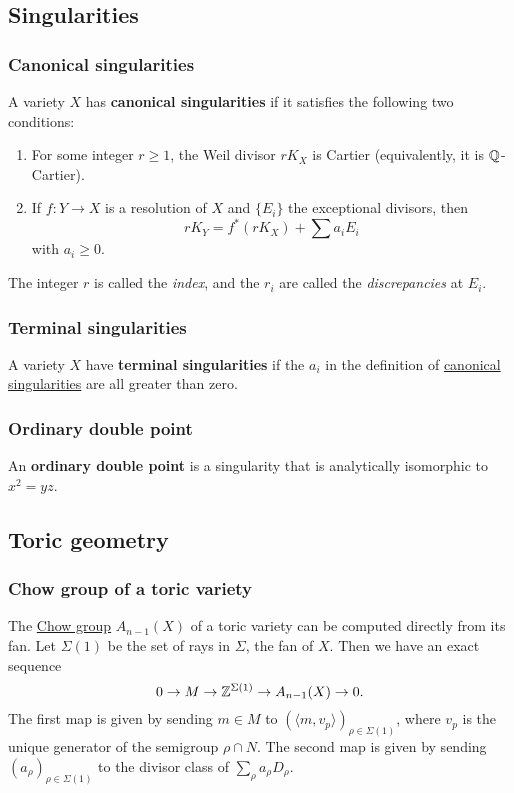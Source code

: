 \documentclass[11pt, english]{article}
\begin{document}
\subsection{Singularities}
\subsubsection{Canonical singularities}
\label{canonicalsings}
A variety $X$ has \textbf{canonical singularities} if it satisfies the following two conditions:
\begin{enumerate}
\item For some integer $r \geq 1$, the Weil divisor $r K_X$ is Cartier (equivalently, it is $\mathbb{Q}$-Cartier).
\item If $f:Y \to X$ is a resolution of $X$ and $\{E_i \}$ the exceptional divisors, then
\[
r K_Y = f^\ast(rK_X) + \sum a_i E_i
\]
with $a_i \geq 0$.
\end{enumerate}
The integer $r$ is called the \emph{index}, and the $r_i$ are called the \emph{discrepancies} at $E_i$.

\subsubsection{Terminal singularities}
\label{terminalsings}

A variety $X$ have \textbf{terminal singularities} if the $a_i$ in the definition of \hyperref[canonicalsings]{canonical singularities} are all greater than zero.

\subsubsection{Ordinary double point}
\label{orddoublepoint}

An \textbf{ordinary double point} is a singularity that is analytically isomorphic to $x^2=yz$.

\subsection{Toric geometry}

\subsubsection{Chow group of a toric variety}
\label{chowtoric}

The \hyperref[chowgroup]{Chow group} $A_{n-1}(X)$ of a toric variety can be computed directly from its fan. Let $\Sigma(1)$ be the set of rays in $\Sigma$, the fan of $X$. Then we have an exact sequence
\[
 0 \to M \to \mathbb{Z}^{\Sigma(1)} \to A_{n-1}(X) \to 0.
\] 
The first map is given by sending $m \in M$ to $(\langle m,v_p \rangle )_{\rho \in \Sigma(1)}$, where $v_p$ is the unique generator of the semigroup $\rho \cap N$. The second map is given by sending $(a_\rho)_{\rho \in \Sigma(1)}$ to the divisor class of $\sum_\rho  a_\rho D_\rho$. 
\end{document}
